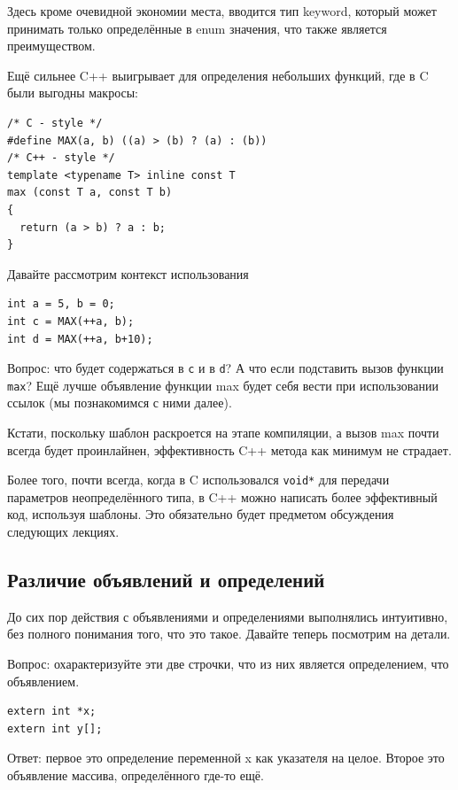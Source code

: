 \documentclass[a4paper,12pt,oneside]{article}
\begin{document}
Здесь кроме очевидной экономии места, вводится тип keyword, который может принимать только определённые в enum значения, что также является преимуществом.

Ещё сильнее C++ выигрывает для определения небольших функций, где в C были выгодны макросы:

\begin{lstlisting}
/* C - style */
#define MAX(a, b) ((a) > (b) ? (a) : (b))
/* C++ - style */
template <typename T> inline const T 
max (const T a, const T b)
{
  return (a > b) ? a : b;
} 
\end{lstlisting}

Давайте рассмотрим контекст использования

\begin{lstlisting}
int a = 5, b = 0;
int c = MAX(++a, b);
int d = MAX(++a, b+10);
\end{lstlisting}

Вопрос: что будет содержаться в \lstinline!c! и в \lstinline!d!? А что если подставить вызов функции \lstinline!max!? Ещё лучше объявление функции max будет себя вести при использовании ссылок (мы познакомимся с ними далее).

Кстати, поскольку шаблон раскроется на этапе компиляции, а вызов max почти всегда будет проинлайнен, эффективность C++ метода как минимум не страдает.

Более того, почти всегда, когда в C использовался \lstinline!void*! для передачи параметров неопределённого типа, в C++ можно написать более эффективный код, используя шаблоны. Это обязательно будет предметом обсуждения следующих лекциях.

\subsection{Различие объявлений и определений}

До сих пор действия с объявлениями и определениями выполнялись интуитивно, без полного понимания того, что это такое. Давайте теперь посмотрим на детали.

Вопрос: охарактеризуйте эти две строчки, что из них является определением, что объявлением.

\begin{lstlisting}
extern int *x;
extern int y[];
\end{lstlisting}

Ответ: первое это определение переменной x как указателя на целое. Второе это объявление массива, определённого где-то ещё.
\end{document}

